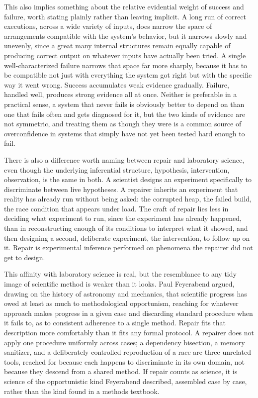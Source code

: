 \documentclass[11pt]{article}
\begin{document}
This also implies something about the relative evidential weight of success and failure, worth stating plainly rather than leaving implicit. A long run of correct executions, across a wide variety of inputs, does narrow the space of arrangements compatible with the system's behavior, but it narrows slowly and unevenly, since a great many internal structures remain equally capable of producing correct output on whatever inputs have actually been tried. A single well-characterized failure narrows that space far more sharply, because it has to be compatible not just with everything the system got right but with the specific way it went wrong. Success accumulates weak evidence gradually. Failure, handled well, produces strong evidence all at once. Neither is preferable in a practical sense, a system that never fails is obviously better to depend on than one that fails often and gets diagnosed for it, but the two kinds of evidence are not symmetric, and treating them as though they were is a common source of overconfidence in systems that simply have not yet been tested hard enough to fail.

There is also a difference worth naming between repair and laboratory science, even though the underlying inferential structure, hypothesis, intervention, observation, is the same in both. A scientist designs an experiment specifically to discriminate between live hypotheses. A repairer inherits an experiment that reality has already run without being asked: the corrupted heap, the failed build, the race condition that appears under load. The craft of repair lies less in deciding what experiment to run, since the experiment has already happened, than in reconstructing enough of its conditions to interpret what it showed, and then designing a second, deliberate experiment, the intervention, to follow up on it. Repair is experimental inference performed on phenomena the repairer did not get to design.

This affinity with laboratory science is real, but the resemblance to any tidy image of scientific method is weaker than it looks. Paul Feyerabend argued, drawing on the history of astronomy and mechanics, that scientific progress has owed at least as much to methodological opportunism, reaching for whatever approach makes progress in a given case and discarding standard procedure when it fails to, as to consistent adherence to a single method. Repair fits that description more comfortably than it fits any formal protocol. A repairer does not apply one procedure uniformly across cases; a dependency bisection, a memory sanitizer, and a deliberately controlled reproduction of a race are three unrelated tools, reached for because each happens to discriminate in its own domain, not because they descend from a shared method. If repair counts as science, it is science of the opportunistic kind Feyerabend described, assembled case by case, rather than the kind found in a methods textbook.
\end{document}
